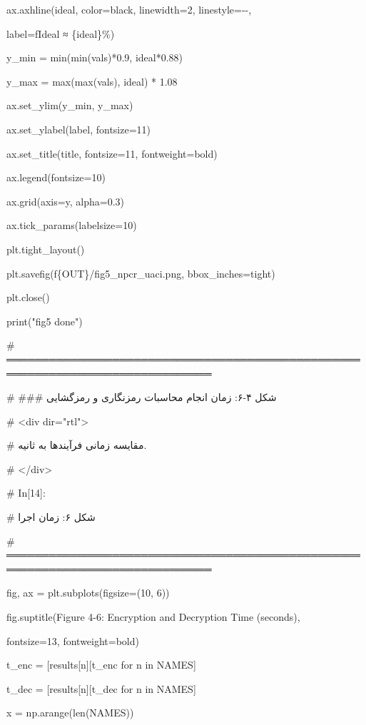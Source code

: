 ax.axhline(ideal, color=\textquotesingle black\textquotesingle, linewidth=2, linestyle=\textquotesingle-\/-\textquotesingle,

label=f\textquotesingle Ideal ≈ \{ideal\}\%\textquotesingle)

y\_min = min(min(vals)*0.9, ideal*0.88)

y\_max = max(max(vals), ideal) * 1.08

ax.set\_ylim(y\_min, y\_max)

ax.set\_ylabel(label, fontsize=11)

ax.set\_title(title, fontsize=11, fontweight=\textquotesingle bold\textquotesingle)

ax.legend(fontsize=10)

ax.grid(axis=\textquotesingle y\textquotesingle, alpha=0.3)

ax.tick\_params(labelsize=10)

plt.tight\_layout()

plt.savefig(f\textquotesingle\{OUT\}/fig5\_npcr\_uaci.png\textquotesingle, bbox\_inches=\textquotesingle tight\textquotesingle)

plt.close()

print("fig5 done")

\# ═══════════════════════════════════════════════════════════════════════════════

\# \#\#\# شکل ۴-۶: زمان انجام محاسبات رمزنگاری و رمزگشایی

\# \textless div dir="rtl"\textgreater{}

\# مقایسه زمانی فرآیندها به ثانیه.

\# \textless/div\textgreater{}

\# In{[}14{]}:

\# شکل ۶: زمان اجرا

\# ═══════════════════════════════════════════════════════════════════════════════

fig, ax = plt.subplots(figsize=(10, 6))

fig.suptitle(\textquotesingle Figure 4-6: Encryption and Decryption Time (seconds)\textquotesingle,

fontsize=13, fontweight=\textquotesingle bold\textquotesingle)

t\_enc = {[}results{[}n{]}{[}\textquotesingle t\_enc\textquotesingle{]} for n in NAMES{]}

t\_dec = {[}results{[}n{]}{[}\textquotesingle t\_dec\textquotesingle{]} for n in NAMES{]}

x = np.arange(len(NAMES))

